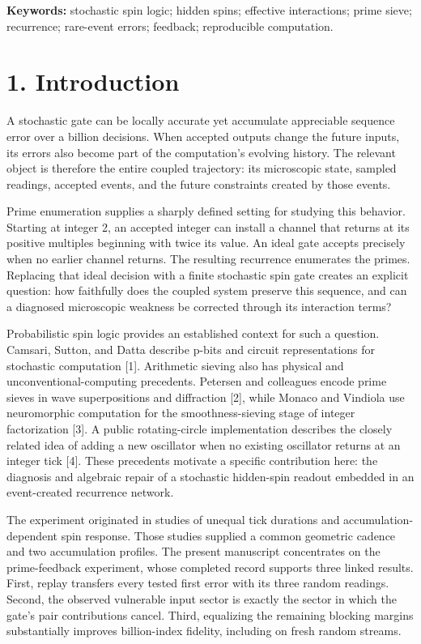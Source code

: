\documentclass[
  11pt,
]{article}
\begin{document}
\textbf{Keywords:} stochastic spin logic; hidden spins; effective
interactions; prime sieve; recurrence; rare-event errors; feedback;
reproducible computation.

\section{1. Introduction}\label{introduction}

A stochastic gate can be locally accurate yet accumulate appreciable
sequence error over a billion decisions. When accepted outputs change
the future inputs, its errors also become part of the computation's
evolving history. The relevant object is therefore the entire coupled
trajectory: its microscopic state, sampled readings, accepted events,
and the future constraints created by those events.

Prime enumeration supplies a sharply defined setting for studying this
behavior. Starting at integer 2, an accepted integer can install a
channel that returns at its positive multiples beginning with twice its
value. An ideal gate accepts precisely when no earlier channel returns.
The resulting recurrence enumerates the primes. Replacing that ideal
decision with a finite stochastic spin gate creates an explicit
question: how faithfully does the coupled system preserve this sequence,
and can a diagnosed microscopic weakness be corrected through its
interaction terms?

Probabilistic spin logic provides an established context for such a
question. Camsari, Sutton, and Datta describe p-bits and circuit
representations for stochastic computation {[}1{]}. Arithmetic sieving
also has physical and unconventional-computing precedents. Petersen and
colleagues encode prime sieves in wave superpositions and diffraction
{[}2{]}, while Monaco and Vindiola use neuromorphic computation for the
smoothness-sieving stage of integer factorization {[}3{]}. A public
rotating-circle implementation describes the closely related idea of
adding a new oscillator when no existing oscillator returns at an
integer tick {[}4{]}. These precedents motivate a specific contribution
here: the diagnosis and algebraic repair of a stochastic hidden-spin
readout embedded in an event-created recurrence network.

The experiment originated in studies of unequal tick durations and
accumulation-dependent spin response. Those studies supplied a common
geometric cadence and two accumulation profiles. The present manuscript
concentrates on the prime-feedback experiment, whose completed record
supports three linked results. First, replay transfers every tested
first error with its three random readings. Second, the observed
vulnerable input sector is exactly the sector in which the gate's pair
contributions cancel. Third, equalizing the remaining blocking margins
substantially improves billion-index fidelity, including on fresh random
streams.
\end{document}
